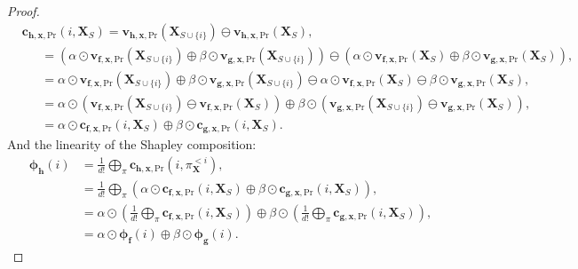 \documentclass{article}
\theoremstyle{plain}
\theoremstyle{definition}
\theoremstyle{remark}
\begin{document}
\begin{proof}
\begin{equation}
    \begin{aligned}
      &\bm{c}_{\bm{h},\bm{x},\text{Pr}}(i,\bm{X}_S) = \bm{v}_{\bm{h},\bm{x},\text{Pr}}(\bm{X}_{S\cup\{i\}}) \ominus \bm{v}_{\bm{h},\bm{x},\text{Pr}}(\bm{X}_S),\\
      &~~~~~~~= \left( \alpha \odot \bm{v}_{\bm{f},\bm{x},\text{Pr}}(\bm{X}_{S\cup\{i\}}) \oplus \beta \odot \bm{v}_{\bm{g},\bm{x},\text{Pr}}(\bm{X}_{S\cup\{i\}}) \right) \ominus \left( \alpha \odot \bm{v}_{\bm{f},\bm{x},\text{Pr}}(\bm{X}_S) \oplus \beta \odot \bm{v}_{\bm{g},\bm{x},\text{Pr}}(\bm{X}_S) \right),\\
      &~~~~~~~= \alpha \odot \bm{v}_{\bm{f},\bm{x},\text{Pr}}(\bm{X}_{S\cup\{i\}}) \oplus \beta \odot \bm{v}_{\bm{g},\bm{x},\text{Pr}}(\bm{X}_{S\cup\{i\}}) \ominus\alpha \odot \bm{v}_{\bm{f},\bm{x},\text{Pr}}(\bm{X}_S) \ominus \beta \odot \bm{v}_{\bm{g},\bm{x},\text{Pr}}(\bm{X}_S),\\
      &~~~~~~~= \alpha \odot \left( \bm{v}_{\bm{f},\bm{x},\text{Pr}}(\bm{X}_{S\cup\{i\}}) \ominus \bm{v}_{\bm{f},\bm{x},\text{Pr}}(\bm{X}_S) \right) \oplus \beta \odot \left( \bm{v}_{\bm{g},\bm{x},\text{Pr}}(\bm{X}_{S\cup\{i\}}) \ominus \bm{v}_{\bm{g},\bm{x},\text{Pr}}(\bm{X}_S)\right),\\
      &~~~~~~~= \alpha \odot \bm{c}_{\bm{f},\bm{x},\text{Pr}}(i,\bm{X}_S) \oplus \beta \odot \bm{c}_{\bm{g},\bm{x},\text{Pr}}(i,\bm{X}_S).
    \end{aligned}
  \end{equation}
  And the linearity of the Shapley composition:
  \begin{equation}
    \begin{aligned}
      \bm{\phi}_{\bm{h}}(i) &= \frac{1}{d!}  \underset{\pi}{\bigoplus}\bm{c}_{\bm{h},\bm{x},\text{Pr}}(i,\pi^{<i}_{\bm{X}}),\\
                            &= \frac{1}{d!}  \underset{\pi}{\bigoplus}\left( \alpha \odot \bm{c}_{\bm{f},\bm{x},\text{Pr}}(i,\bm{X}_S) \oplus \beta \odot \bm{c}_{\bm{g},\bm{x},\text{Pr}}(i,\bm{X}_S) \right),\\
                            &= \alpha \odot \left( \frac{1}{d!}  \underset{\pi}{\bigoplus} \bm{c}_{\bm{f},\bm{x},\text{Pr}}(i,\bm{X}_S) \right) \oplus \beta \odot \left( \frac{1}{d!} \underset{\pi}{\bigoplus}    \bm{c}_{\bm{g},\bm{x},\text{Pr}}(i,\bm{X}_S) \right),\\
                            &= \alpha \odot \bm{\phi}_{\bm{f}}(i) \oplus \beta\odot \bm{\phi}_{\bm{g}}(i).
    \end{aligned}
  \end{equation}
\end{proof}
\end{document}
